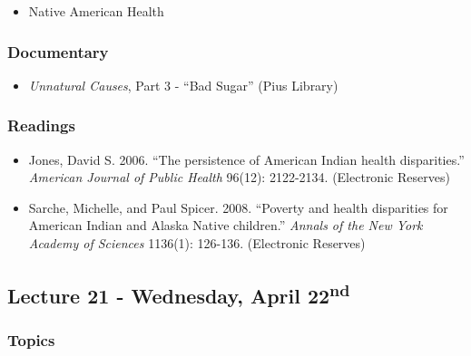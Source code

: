\documentclass[]{book}
\providecommand{\tightlist}{%
  \setlength{\itemsep}{0pt}\setlength{\parskip}{0pt}}
\begin{document}
\begin{itemize}
\tightlist
\item
  Native American Health
\end{itemize}

\hypertarget{documentary-2}{%
\subsubsection*{Documentary}\label{documentary-2}}

\begin{itemize}
\tightlist
\item
  \emph{Unnatural Causes}, Part 3 - ``Bad Sugar'' (Pius Library)
\end{itemize}

\hypertarget{readings-24}{%
\subsubsection*{Readings}\label{readings-24}}

\begin{itemize}
\tightlist
\item
  Jones, David S. 2006. ``The persistence of American Indian health disparities.'' \emph{American Journal of Public Health} 96(12): 2122-2134. (Electronic Reserves)
\item
  Sarche, Michelle, and Paul Spicer. 2008. ``Poverty and health disparities for American Indian and Alaska Native children.'' \emph{Annals of the New York Academy of Sciences} 1136(1): 126-136. (Electronic Reserves)
\end{itemize}

\hypertarget{lecture-21---wednesday-april-22nd}{%
\subsection*{\texorpdfstring{Lecture 21 - Wednesday, April 22\textsuperscript{nd}}{Lecture 21 - Wednesday, April 22nd}}\label{lecture-21---wednesday-april-22nd}}

\hypertarget{topics-27}{%
\subsubsection*{Topics}\label{topics-27}}
\end{document}
